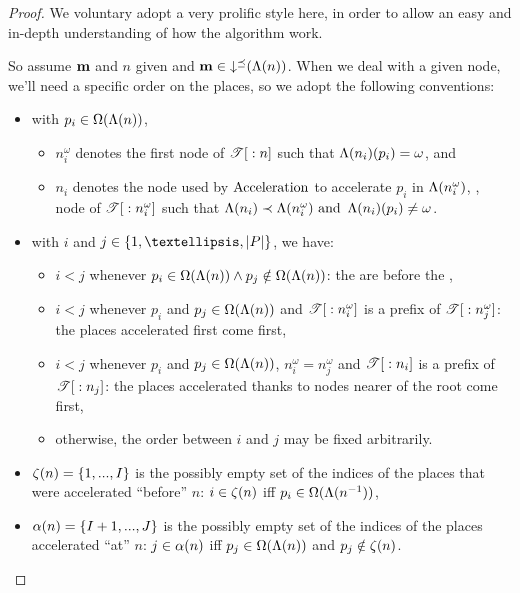 \begin{proof}
  We voluntary adopt a very prolific style here, in order to allow an easy and in-depth understanding of how the algorithm work.

  So assume $\mathbf{m}$ and $n$ given and $\mathbf{m} \in \operatorname{\downarrow^\preceq}(\operatorname{\Lambda}(n))$.
  When we deal with a given node, we'll need a specific order on the places, so we adopt the following conventions:
  \begin{itemize}
    \item with $p_i \in \operatorname{\Omega}(\operatorname{\Lambda}(n))$,
      \begin{itemize}
        \item $n^\omega_i$ denotes the first node of ${\mathscr{T}}[{}:{n}]$ such that $\operatorname{\Lambda}(n_i)(p_i) = \omega$, and
        \item $n_i$ denotes the node used by $\operatorname{Acceleration}$ to accelerate $p_i$ in $\operatorname{\Lambda}(n^\omega_i)$, ,  node of ${\mathscr{T}}[{}:{n^\omega_i}]$ such that $\operatorname{\Lambda}(n_i) \prec \operatorname{\Lambda}(n^\omega_i) \text{ and } \operatorname{\Lambda}(n_i)(p_i) \neq \omega$.
      \end{itemize}
    \item with $i$ and $j \in \{1, …, \card{\places}\}$, we have:
      \begin{itemize}
        \item $i < j$ whenever $p_i \in \operatorname{\Omega}(\operatorname{\Lambda}(n)) \wedge p_j \notin \operatorname{\Omega}(\operatorname{\Lambda}(n))$:
          the \oplaces are before the \noplaces,
        \item $i < j$ whenever $p_i$ and $p_j \in \operatorname{\Omega}(\operatorname{\Lambda}(n))$ and ${\mathscr{T}}[{}:{n^\omega_i}]$ is a prefix of ${\mathscr{T}}[{}:{n^\omega_j}]$:
          the places accelerated first come first,
        \item $i < j$ whenever $p_i$ and $p_j \in \operatorname{\Omega}(\operatorname{\Lambda}(n))$, $n^\omega_i = n^\omega_j$ and ${\mathscr{T}}[{}:{n_i}]$ is a prefix of ${\mathscr{T}}[{}:{n_j}]$:
          the places accelerated thanks to nodes nearer of the root come first,
        \item otherwise, the order between $i$ and $j$ may be fixed arbitrarily.
      \end{itemize}
    \item $\operatorname{\zeta}(n) = \{1, ..., I\}$ is the possibly empty set of the indices of the places that were accelerated ``before'' $n$: $i \in \operatorname{\zeta}(n)$ iff $p_i \in \operatorname{\Omega}(\operatorname{\Lambda}(n^{-1}))$,
    \item $\operatorname{\alpha}(n) = \{I+1, ..., J\}$ is the possibly empty set of the indices of the places accelerated ``at'' $n$: $j \in \operatorname{\alpha}(n)$ iff $p_j \in \operatorname{\Omega}(\operatorname{\Lambda}(n))$ and $p_j \notin \operatorname{\zeta}(n)$.%
  \end{itemize}


\end{proof}

